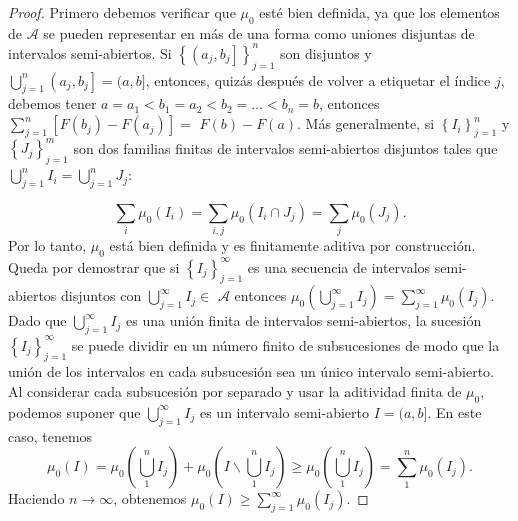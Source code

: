 \begin{proof}
 Primero debemos verificar que $\mu_{0}$ esté bien definida, ya que los elementos de $\mathcal{A}$ se pueden representar en más de una forma como uniones disjuntas de intervalos semi-abiertos. Si $\left\{\left(a_{j}, b_{j}\right]\right\}_{j=1}^{n}$ son disjuntos y $\bigcup\limits_{j=1}^{n}\left( a_{j}, b_{j}\right]=(a, b]$, entonces, quizás después de volver a etiquetar el índice $j$, debemos tener $a=a_{1}<b_{1}=a_{2 }<b_{2}=\ldots<b_{n}=b$, entonces $\sum\limits_{j=1}^{n}\left[F\left(b_{j}\right)-F\left(a_{ j}\right)\right]=$ $F(b)-F(a)$. Más generalmente, si $\left\{I_{i}\right\}_{j=1}^{n}$ y $ \left\{J_{j}\right\}_{j=1}^{m}$ son dos familias  finitas de intervalos semi-abiertos disjuntos tales que $\bigcup\limits_{j=1}^{n} I_{i}=\bigcup\limits_{j=1}^{n} J_{j}$:
 
$$
\sum_{i} \mu_{0}\left(I_{i}\right)=\sum_{i, j} \mu_{0}\left(I_{i} \cap J_{j}\right)= \sum_{j} \mu_{0}\left(J_{j}\right) .
$$
Por lo tanto, $\mu_{0}$ está bien definida y es finitamente aditiva por construcción.
Queda por demostrar que si $\left\{I_{j}\right\}_{j=1}^{\infty}$ es una secuencia de intervalos semi-abiertos disjuntos con $\bigcup\limits_{j=1}^{\infty} I_{j} \in$ $\mathcal{A}$ entonces $\mu_{0}\left(\bigcup\limits_{j=1}^{\infty} I_{j}\right)=\sum\limits_{j=1}^{\infty } \mu_{0}\left(I_{j}\right)$. Dado que $\bigcup\limits_{j=1}^{\infty} I_{j}$ es una unión finita de  intervalos semi-abiertos, la sucesión $\left\{I_{j}\right\}_{j=1}^{\infty} $ se puede dividir en un número finito de subsucesiones de modo que la unión de los intervalos en cada subsucesión sea un único intervalo semi-abierto. Al considerar cada subsucesión por separado y usar la aditividad finita de $\mu_{0}$, podemos suponer que $\bigcup\limits_{j=1}^{\infty} I_{j}$ es un intervalo semi-abierto $I=(a, b]$. En este caso, tenemos
$$
\mu_{0}(I)=\mu_{0}\left(\bigcup_{1}^{n} I_{j}\right)+\mu_{0}\left(I \backslash \bigcup_{1} ^{n} I_{j}\right) \geq \mu_{0}\left(\bigcup_{1}^{n} I_{j}\right)=\sum_{1}^{n} \mu_{ 0}\left(I_{j}\right) .
$$
Haciendo $n \rightarrow \infty$, obtenemos $\mu_{0}(I) \geq \sum\limits_{j=1}^{\infty} \mu_0\left(I_{j}\right)$. 


\end{proof}

